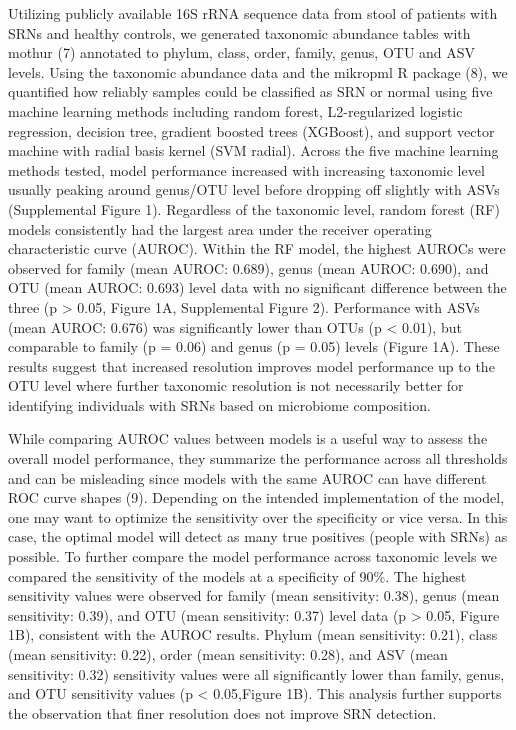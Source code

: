\documentclass[
]{article}
\begin{document}
Utilizing publicly available 16S rRNA sequence data from stool of
patients with SRNs and healthy controls, we generated taxonomic
abundance tables with mothur (7) annotated to phylum, class, order,
family, genus, OTU and ASV levels. Using the taxonomic abundance data
and the mikropml R package (8), we quantified how reliably samples could
be classified as SRN or normal using five machine learning methods
including random forest, L2-regularized logistic regression, decision
tree, gradient boosted trees (XGBoost), and support vector machine with
radial basis kernel (SVM radial). Across the five machine learning
methods tested, model performance increased with increasing taxonomic
level usually peaking around genus/OTU level before dropping off
slightly with ASVs (Supplemental Figure 1). Regardless of the taxonomic
level, random forest (RF) models consistently had the largest area under
the receiver operating characteristic curve (AUROC). Within the RF
model, the highest AUROCs were observed for family (mean AUROC: 0.689),
genus (mean AUROC: 0.690), and OTU (mean AUROC: 0.693) level data with
no significant difference between the three (p \textgreater{} 0.05,
Figure 1A, Supplemental Figure 2). Performance with ASVs (mean AUROC:
0.676) was significantly lower than OTUs (p \textless{} 0.01), but
comparable to family (p = 0.06) and genus (p = 0.05) levels (Figure 1A).
These results suggest that increased resolution improves model
performance up to the OTU level where further taxonomic resolution is
not necessarily better for identifying individuals with SRNs based on
microbiome composition.

While comparing AUROC values between models is a useful way to assess
the overall model performance, they summarize the performance across all
thresholds and can be misleading since models with the same AUROC can
have different ROC curve shapes (9). Depending on the intended
implementation of the model, one may want to optimize the sensitivity
over the specificity or vice versa. In this case, the optimal model will
detect as many true positives (people with SRNs) as possible. To further
compare the model performance across taxonomic levels we compared the
sensitivity of the models at a specificity of 90\%. The highest
sensitivity values were observed for family (mean sensitivity: 0.38),
genus (mean sensitivity: 0.39), and OTU (mean sensitivity: 0.37) level
data (p \textgreater{} 0.05, Figure 1B), consistent with the AUROC
results. Phylum (mean sensitivity: 0.21), class (mean sensitivity:
0.22), order (mean sensitivity: 0.28), and ASV (mean sensitivity: 0.32)
sensitivity values were all significantly lower than family, genus, and
OTU sensitivity values (p \textless{} 0.05,Figure 1B). This analysis
further supports the observation that finer resolution does not improve
SRN detection.
\end{document}
